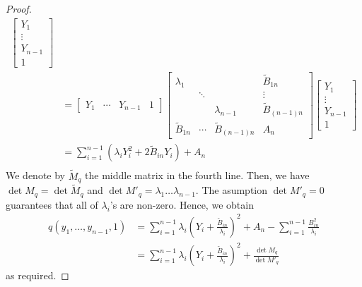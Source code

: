 \documentclass[pdftex,a4paper,12pt]{scrartcl}
\theoremstyle{plain}
\theoremstyle{definition}
\theoremstyle{remark}
\begin{document}
\begin{proof}
\[\begin{split}
\begin{bmatrix}
Y_1 \\ \vdots \\ Y_{n-1} \\ 1
\end{bmatrix}
\\
&= 
\begin{bmatrix}
Y_1 & \cdots & Y_{n-1} & 1
\end{bmatrix}
\begin{bmatrix}
\lambda_1  && &\widetilde B_{1n} \\
& \ddots && \vdots \\
&& \lambda_{n-1} & \widetilde B_{(n-1)n} \\
\widetilde B_{1n} & \cdots & \widetilde B_{(n-1)n} & A_n
\end{bmatrix}
\begin{bmatrix}
Y_1 \\ \vdots \\ Y_{n-1} \\ 1
\end{bmatrix}
\\
&= \sum_{i=1}^{n-1} (\lambda_i Y_i^2 + 2\widetilde B_{in}Y_i) + A_n
\\
\end{split}
\]
We denote by $\widetilde M_q$ the middle matrix in the fourth line.
Then, we have $\det M_q = \det \widetilde M_q$ and $\det M'_q =\lambda_1\dots\lambda_{n-1}$.
The asumption $\det M'_q=0$ guarantees that all of $\lambda_i$'s are non-zero.
Hence, we obtain
\[
\begin{split}
q(y_1,\dots,y_{n-1},1)
&= \sum_{i=1}^{n-1} \lambda_i\left(Y_i + \frac{\widetilde B_{in}}{\lambda_i}\right)^2
+ A_n-\sum_{i=1}^{n-1}\frac{B_{in}^2}{\lambda_i} \\
&= \sum_{i=1}^{n-1} \lambda_i\left(Y_i + \frac{\widetilde B_{in}}{\lambda_i}\right)^2 + \frac{\det M_q}{\det M'_q}
\end{split}
\]
as required.
\end{proof}
\end{document}
